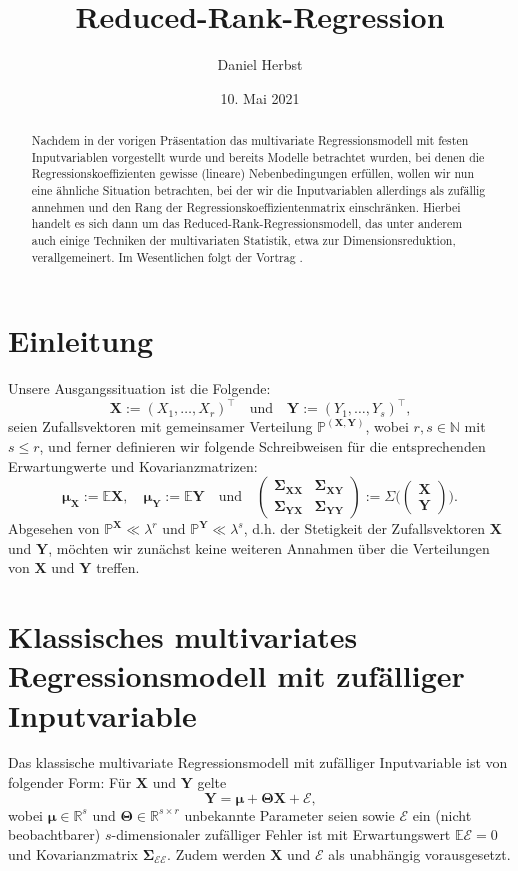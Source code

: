 \documentclass[]{article}
\title{Reduced-Rank-Regression}
\author{Daniel Herbst}
\date{10. Mai 2021}
\newcommand{\Pb}{\mathbb{P}}
\newcommand{\E}{\mathbb{E}}
\newcommand{\R}{\mathbb{R}}
\newcommand{\N}{\mathbb{N}}
\newcommand{\X}{\mathbf{X}}
\newcommand{\Y}{\mathbf{Y}}
\newcommand{\T}{\mathbf{\Theta}}
\newcommand{\muu}{\bm{\mu}}
\newcommand{\Ssigma}{\mathbf{\Sigma}}
\begin{document}
\maketitle

\begin{abstract}
Nachdem in der vorigen Präsentation das multivariate Regressionsmodell mit festen Inputvariablen vorgestellt wurde und 
bereits Modelle betrachtet wurden, bei denen die Regressionskoeffizienten gewisse (lineare) Nebenbedingungen
erfüllen, wollen wir nun eine ähnliche Situation betrachten, bei der wir die Inputvariablen allerdings als
zufällig annehmen und den Rang der Regressionskoeffizientenmatrix einschränken. Hierbei handelt es sich dann um das
Reduced-Rank-Regressionsmodell, das unter anderem auch einige Techniken der multivariaten Statistik, etwa zur Dimensionsreduktion, 
verallgemeinert. Im Wesentlichen folgt der Vortrag 
\cite[Kapitel 6.3]{Iz08}.
\end{abstract}

\section{Einleitung}
\label{Einleitung}
Unsere Ausgangssituation ist die Folgende:
$$\X := (X_1, \dots, X_r)^\top \quad \text{und} \quad \Y := (Y_1, \dots, Y_s)^\top \text{,}$$
seien Zufallsvektoren mit gemeinsamer Verteilung $\Pb^{(\X, \Y)}$, wobei $r, s \in \N$ mit $s \leq r$,
und ferner definieren wir folgende Schreibweisen für die entsprechenden Erwartungwerte und Kovarianzmatrizen:
$$ \muu_\X := \E\X, \quad \muu_\Y := \E\Y \quad \text{und} \quad \begin{pmatrix}
	\Ssigma_{\X\X} & \Ssigma_{\X\Y} \\
	\Ssigma_{\Y\X} & \Ssigma_{\Y\Y}
\end{pmatrix} := \Sigma \biggl(\begin{pmatrix}
\X \\
\Y
\end{pmatrix}\biggr).$$
Abgesehen von $\Pb^\X \ll \lambda^r$ und $\Pb^\Y \ll \lambda^s$, d.h. der Stetigkeit der Zufallsvektoren $\X$ und $\Y$, möchten wir zunächst keine
weiteren Annahmen über die Verteilungen von $\X$ und $\Y$ treffen.

\section{Klassisches multivariates Regressionsmodell mit zufälliger Inputvariable}

Das klassische multivariate Regressionsmodell mit zufälliger Inputvariable ist von folgender Form: Für $\X$ und $\Y$ gelte
\[ \Y = \muu + \T \X + \mathcal{E} \text{,} \label{eq:2.1} \tag{2.1}\]
wobei $\muu \in \R^s$ und $\T \in \R^{s \times r}$ unbekannte Parameter seien sowie $\mathcal{E}$ ein (nicht beobachtbarer) $s$-dimensionaler zufälliger Fehler ist mit Erwartungswert $\E \mathcal{E} = 0$ und Kovarianzmatrix $\Ssigma_{\mathcal{E} \mathcal{E}}$. Zudem werden $\X$ und
$\mathcal{E}$ als unabhängig vorausgesetzt.
\\
\end{document}
